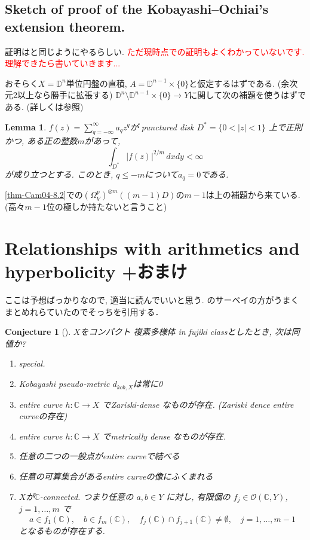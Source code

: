 \documentclass[dvipdfmx,a4paper,11pt]{article} %
\newtheorem{conj}[thm]{Conjecture}
\newtheorem{lem}[thm]{Lemma}
\theoremstyle{definition}
\theoremstyle{remark}
\numberwithin{equation}{section}
\newcommand{\C}{\mathbb{C}}
\newcommand{\D}{\mathbb{D}}
\newcommand{\xr}[1]{\textcolor{red}{#1}}
\begin{document}
\subsection{Sketch of proof of the Kobayashi–Ochiai's extension theorem. \cite[8.1]{Cam04}}

証明は\cite{KO75}と同じようにやるらしい. \xr{ただ現時点で\cite{KO75}の証明もよくわかっていないです. 理解できたら書いていきます...}

おそらく$X = \D^n$単位円盤の直積, $A = \D^{n-1} \times \{ 0 \}$と仮定するはずである. (余次元2以上なら勝手に拡張する)
$\D^n \setminus  \D^{n-1} \times \{ 0 \} \to Y$に関して次の補題を使うはずである. (詳しくは\cite[Theorem 7.5.1]{Kob98}参照)

\begin{lem}\cite[Lemma 7.5.8]{Kob98}
\( f(z) = \sum_{q=-\infty}^{\infty} a_q z^q \)が
punctured disk \( D^* = \{ 0 < |z| < 1 \} \) 上で正則かつ, ある正の整数$m$があって, 
\[
\int_{D^*} |f(z)|^{2/m}\, dx dy < \infty
\]
が成り立つとする. 
このとき, \( q \leq -m \)について\( a_q = 0 \)である.
\end{lem}
\ref{thm-Cam04-8.2}での$(\Omega_V^p)^{\otimes m}((m-1)D)$の$m-1$は上の補題から来ている. 
(高々$m-1$位の極しか持たないと言うこと)

\section{ Relationships with arithmetics and hyperbolicity +おまけ}
ここは予想ばっかりなので, 適当に読んでいいと思う. 
\cite{Voi}のサーベイの方がうまくまとめれらていたのでそっちを引用する．
\begin{conj}[{\cite[9.2, 9.8, 9.5 and 9.20]{Cam04}}]
\( X \)をコンパクト 複素多様体 in fujiki classとしたとき, 次は同値か?
\begin{enumerate}
\item special.
\item Kobayashi pseudo-metric $d_{kob, X}$は常に0
\item entire curve \( h : \mathbb{C} \to X \) でZariski-dense なものが存在. (Zariski dence entire curveの存在)
\item entire curve \( h : \mathbb{C} \to X \) でmetrically dense なものが存在. 
\item 任意の二つの一般点がentire curveで結べる
\item 任意の可算集合があるentire curveの像にふくまれる
\item $X$が$\C$-connected. つまり任意の $a, b \in Y$ に対し, 有限個の $f_j \in \mathcal{O}(\mathbb{C}, Y)$, $j = 1, \dots, m$ で
  \[
  a \in f_1(\mathbb{C}), \quad b \in f_m(\mathbb{C}), \quad f_j(\mathbb{C}) \cap f_{j+1}(\mathbb{C}) \neq \emptyset, \quad j = 1, \dots, m-1
  \]
  となるものが存在する. 
\end{enumerate}
\end{conj}
\end{document}
